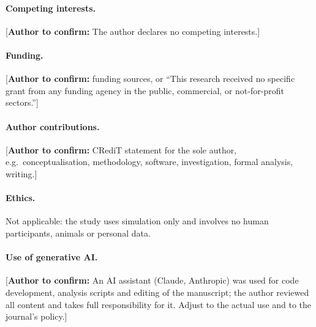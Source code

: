 \documentclass[11pt]{article}
\newcommand{\authorcheck}[1]{\textcolor{blue!70!black}{[\textbf{Author to confirm:} #1]}}
\theoremstyle{definition}
\theoremstyle{remark}
\begin{document}
\paragraph{Competing interests.} \authorcheck{The author declares no competing interests.}
\paragraph{Funding.} \authorcheck{funding sources, or ``This research received no specific grant from any funding agency in the public, commercial, or not-for-profit sectors.''}
\paragraph{Author contributions.} \authorcheck{CRediT statement for the sole author, e.g.\ conceptualisation, methodology, software, investigation, formal analysis, writing.}
\paragraph{Ethics.} Not applicable: the study uses simulation only and involves no human participants, animals or personal data.
\paragraph{Use of generative AI.} \authorcheck{An AI assistant (Claude, Anthropic) was used for code development, analysis scripts and editing of the manuscript; the author reviewed all content and takes full responsibility for it. Adjust to the actual use and to the journal's policy.}



\end{document}
